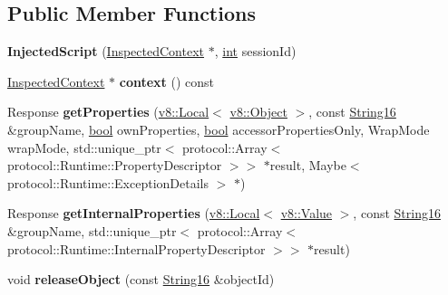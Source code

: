 \subsection*{Public Member Functions}
\begin{DoxyCompactItemize}
\item 
\mbox{\label{classv8__inspector_1_1InjectedScript_a503b378495277d5508a707966016d9ed}} 
{\bfseries Injected\+Script} (\mbox{\hyperlink{classv8__inspector_1_1InspectedContext}{Inspected\+Context}} $\ast$, \mbox{\hyperlink{classint}{int}} session\+Id)
\item 
\mbox{\label{classv8__inspector_1_1InjectedScript_ae62bf57c9242e791e7cbad2cc995dfc5}} 
\mbox{\hyperlink{classv8__inspector_1_1InspectedContext}{Inspected\+Context}} $\ast$ {\bfseries context} () const
\item 
\mbox{\label{classv8__inspector_1_1InjectedScript_aaf8290249bb56f91ec5757f0573b3764}} 
Response {\bfseries get\+Properties} (\mbox{\hyperlink{classv8_1_1Local}{v8\+::\+Local}}$<$ \mbox{\hyperlink{classv8_1_1Object}{v8\+::\+Object}} $>$, const \mbox{\hyperlink{classv8__inspector_1_1String16}{String16}} \&group\+Name, \mbox{\hyperlink{classbool}{bool}} own\+Properties, \mbox{\hyperlink{classbool}{bool}} accessor\+Properties\+Only, Wrap\+Mode wrap\+Mode, std\+::unique\+\_\+ptr$<$ protocol\+::\+Array$<$ protocol\+::\+Runtime\+::\+Property\+Descriptor $>$$>$ $\ast$result, Maybe$<$ protocol\+::\+Runtime\+::\+Exception\+Details $>$ $\ast$)
\item 
\mbox{\label{classv8__inspector_1_1InjectedScript_a0313d5809932f40f1d56c037bbf4a9a7}} 
Response {\bfseries get\+Internal\+Properties} (\mbox{\hyperlink{classv8_1_1Local}{v8\+::\+Local}}$<$ \mbox{\hyperlink{classv8_1_1Value}{v8\+::\+Value}} $>$, const \mbox{\hyperlink{classv8__inspector_1_1String16}{String16}} \&group\+Name, std\+::unique\+\_\+ptr$<$ protocol\+::\+Array$<$ protocol\+::\+Runtime\+::\+Internal\+Property\+Descriptor $>$$>$ $\ast$result)
\item 
\mbox{\label{classv8__inspector_1_1InjectedScript_ab385959e22d37ddb4254e50b37896f94}} 
void {\bfseries release\+Object} (const \mbox{\hyperlink{classv8__inspector_1_1String16}{String16}} \&object\+Id)

\end{DoxyCompactItemize}
